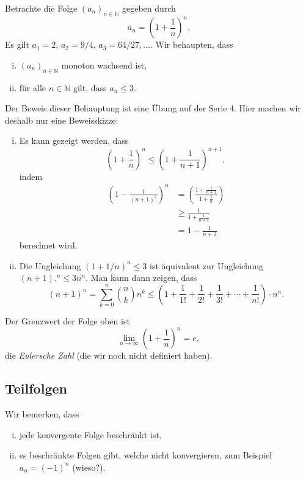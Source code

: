 \documentclass[../main.tex]{subfiles}
\begin{document}
\begin{example}
  Betrachte die Folge ${(a_n)}_{n \in \mathbb{N}}$ 
  gegeben durch
   \[
   a_n = {\left( 1 + \frac{1}{n} \right)}^n.
   \]
   Es gilt $a_1 = 2$, $a_2 = 9/4$, $a_3 = 64/27, \dots$.
   Wir behaupten, dass
   \begin{enumerate}[(i)]
     \item ${(a_n)}_{n \in \mathbb{N}}$ monoton wachsend ist,
     \item für alle $n \in \mathbb{N}$ gilt, dass
       $a_n \leq 3$.
   \end{enumerate}
   Der Beweis dieser Behauptung ist eine Übung auf
   der Serie 4. Hier machen wir deshalb nur eine Beweisskizze:
   \begin{enumerate}[(i)]
     \item Es kann gezeigt werden, dass
       \[
         {\left( 1 + \frac{1}{n} \right) }^n \leq
         {\left( 1 + \frac{1}{n+1} \right)}^{n+1},
       \]
       indem 
       \begin{align*}
         {\left( 1 - \frac{1}{{(n+1)}^2} \right)}^n &=
         {\left( \frac{1 + \frac{1}{n+1}}{1 + \frac{1}{n}} \right) } \\& 
         \geq \frac{1}{1 + \frac{1}{n+1}}\\
                                                                                   &= 1 - \frac{1}{n+2}
       \end{align*}
       berechnet wird.
     \item
       Die Ungleichung ${(1 + 1/n)}^n \leq 3$ ist äquivalent
       zur Ungleichung ${(n + 1)}.^n \leq 3n^n$.
       Man kann dann zeigen, dass
       \[
         {(n+1)}^n =
         \sum_{k=0}^{n} \binom{n}{k}n^k 
         \leq \left( 1 + \frac{1}{1!}
         + \frac{1}{2!} + \frac{1}{3!} + \cdots +
       \frac{1}{n!}\right) \cdot n^n.
       \]
   \end{enumerate}
\end{example}

\begin{remark}
  Der Grenzwert der Folge oben ist
  \[
    \lim_{n \to \infty} {\left( 1 + \frac{1}{n} \right)}^n = e,
  \]
  die \emph{Eulersche Zahl} (die wir noch nicht definiert haben).
\end{remark}

\subsection*{Teilfolgen}
Wir bemerken, dass
\begin{enumerate}[(i)]
  \item jede konvergente Folge beschränkt ist,
  \item es beschränkte Folgen gibt, welche nicht konvergieren,
    zum Beispiel $a_n = {(-1)}^n$ (wieso?).
\end{enumerate}
\end{document}
